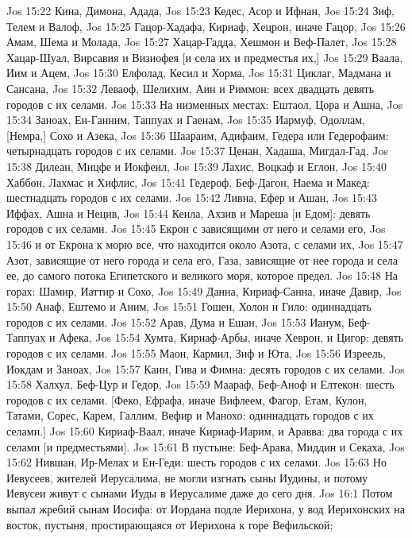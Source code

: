 \vs Jos 15:22 Кина, Димона, Адада,
\vs Jos 15:23 Кедес, Асор и Ифнан,
\vs Jos 15:24 Зиф, Телем и Валоф,
\vs Jos 15:25 Гацор-Хадафа, Кириаф, Хецрон, иначе Гацор,
\vs Jos 15:26 Амам, Шема и Молада,
\vs Jos 15:27 Хацар-Гадда, Хешмон и Веф-Палет,
\vs Jos 15:28 Хацар-Шуал, Вирсавия и Визиофея [и села их и предместья их,]
\vs Jos 15:29 Ваала, Иим и Ацем,
\vs Jos 15:30 Елфолад, Кесил и Хорма,
\vs Jos 15:31 Циклаг, Мадмана и Сансана,
\vs Jos 15:32 Леваоф, Шелихим, Аин и Риммон: всех двадцать девять городов с их селами.
\vs Jos 15:33 На низменных местах: Ештаол, Цора и Ашна,
\vs Jos 15:34 Заноах, Ен-Ганним, Таппуах и Гаенам,
\vs Jos 15:35 Иармуф, Одоллам, [Немра,] Сохо и Азека,
\vs Jos 15:36 Шаараим, Адифаим, Гедера или Гедерофаим: четырнадцать городов с их селами.
\vs Jos 15:37 Ценан, Хадаша, Мигдал-Гад,
\vs Jos 15:38 Дилеан, Мицфе и Иокфеил,
\vs Jos 15:39 Лахис, Воцкаф и Еглон,
\vs Jos 15:40 Хаббон, Лахмас и Хифлис,
\vs Jos 15:41 Гедероф, Беф-Дагон, Наема и Макед: шестнадцать городов с их селами.
\vs Jos 15:42 Ливна, Ефер и Ашан,
\vs Jos 15:43 Иффах, Ашна и Нецив,
\vs Jos 15:44 Кеила, Ахзив и Мареша [и Едом]: девять городов с их селами.
\vs Jos 15:45 Екрон с зависящими от него  и селами его,
\vs Jos 15:46 и от Екрона к морю все, что находится около Азота, с селами их,
\vs Jos 15:47 Азот, зависящие от него города и села его, Газа, зависящие от нее города и села ее, до самого потока Египетского и великого моря, которое  предел.
\vs Jos 15:48 На горах: Шамир, Иаттир и Сохо,
\vs Jos 15:49 Данна, Кириаф-Санна, иначе Давир,
\vs Jos 15:50 Анаф, Ештемо и Аним,
\vs Jos 15:51 Гошен, Холон и Гило: одиннадцать городов с их селами.
\vs Jos 15:52 Арав, Дума и Ешан,
\vs Jos 15:53 Ианум, Беф-Таппуах и Афека,
\vs Jos 15:54 Хумта, Кириаф-Арбы, иначе Хеврон, и Цигор: девять городов с их селами.
\vs Jos 15:55 Маон, Кармил, Зиф и Юта,
\vs Jos 15:56 Изреель, Иокдам и Заноах,
\vs Jos 15:57 Каин, Гива и Фимна: десять городов с их селами.
\vs Jos 15:58 Халхул, Беф-Цур и Гедор,
\vs Jos 15:59 Маараф, Беф-Аноф и Елтекон: шесть городов с их селами. [Феко, Ефрафа, иначе Вифлеем, Фагор, Етам, Кулон, Татами, Сорес, Карем, Галлим, Вефир и Манохо: одиннадцать городов с их селами.]
\vs Jos 15:60 Кириаф-Ваал, иначе Кириаф-Иарим, и Аравва: два города с их селами [и предместьями].
\vs Jos 15:61 В пустыне: Беф-Арава, Миддин и Секаха,
\vs Jos 15:62 Нившан, Ир-Мелах и Ен-Геди: шесть городов с их селами.
\vs Jos 15:63 Но Иевусеев, жителей Иерусалима, не могли изгнать сыны Иудины, и потому Иевусеи живут с сынами Иуды в Иерусалиме даже до сего дня.
\vs Jos 16:1 Потом выпал жребий сынам Иосифа: от Иордана подле Иерихона, у вод Иерихонских на восток, пустыня, простирающаяся от Иерихона к горе Вефильской;
